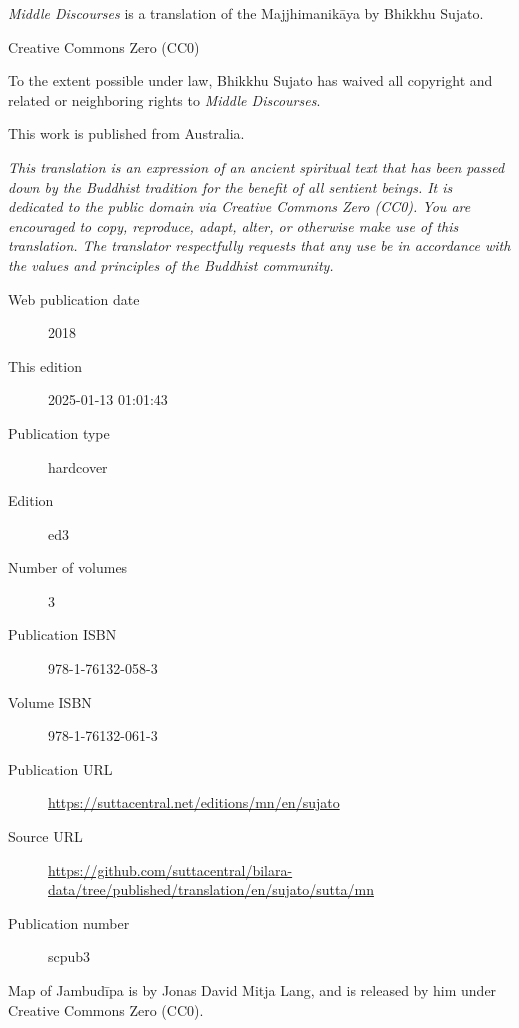 \documentclass[12pt,openany]{book}%
\begin{document}
\begin{footnotesize}

\textit{Middle Discourses} is a translation of the Majjhimanikāya by Bhikkhu Sujato.

\medskip

Creative Commons Zero (CC0)

To the extent possible under law, Bhikkhu Sujato has waived all copyright and related or neighboring rights to \textit{Middle Discourses}.

\medskip

This work is published from Australia.

\begin{center}
\textit{This translation is an expression of an ancient spiritual text that has been passed down by the Buddhist tradition for the benefit of all sentient beings. It is dedicated to the public domain via Creative Commons Zero (CC0). You are encouraged to copy, reproduce, adapt, alter, or otherwise make use of this translation. The translator respectfully requests that any use be in accordance with the values and principles of the Buddhist community.}
\end{center}

\medskip

\begin{description}
    \item[Web publication date] 2018
    \item[This edition] 2025-01-13 01:01:43
    \item[Publication type] hardcover
    \item[Edition] ed3
    \item[Number of volumes] 3
    \item[Publication ISBN] 978-1-76132-058-3
    \item[Volume ISBN] 978-1-76132-061-3
    \item[Publication URL] \href{https://suttacentral.net/editions/mn/en/sujato}{https://suttacentral.net/editions/mn/en/sujato}
    \item[Source URL] \href{https://github.com/suttacentral/bilara-data/tree/published/translation/en/sujato/sutta/mn}{https://github.com/suttacentral/bilara-data/tree/published/translation/en/sujato/sutta/mn}
    \item[Publication number] scpub3
\end{description}

\medskip

Map of Jambudīpa is by Jonas David Mitja Lang, and is released by him under Creative Commons Zero (CC0).


\end{footnotesize}
\end{document}
